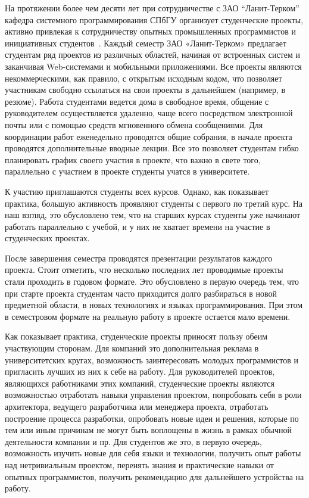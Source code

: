 \documentclass[a5paper]{article}
\begin{document}
На протяжении более чем десяти лет при сотрудничестве с ЗАО ``Ланит-Терком''~\cite{tercom} кафедра системного программирования СПбГУ организует студенческие проекты, активно привлекая к сотрудничеству опытных промышленных программистов и инициативных студентов~\cite{gagarsky}. Каждый семестр ЗАО «Ланит-Терком» предлагает студентам ряд проектов из различных областей, начиная от встроенных систем и заканчивая Web-системами и мобильными приложениями. Все проекты являются некоммерческими, как правило, с открытым исходным кодом, что позволяет участникам свободно ссылаться на свои проекты в дальнейшем (например, в резюме). Работа студентами ведется дома в свободное время, общение с руководителем осуществляется удаленно, чаще всего посредством электронной почты или с помощью средств мгновенного обмена сообщениями. Для координации работ еженедельно проводятся общие собрания, в начале проекта проводятся дополнительные вводные лекции. Все это позволяет студентам гибко планировать график своего участия в проекте, что важно в свете того, параллельно с участием в проекте студенты учатся в университете. 

К участию приглашаются студенты всех курсов. Однако, как показывает практика, б\textit{о}льшую активность проявляют студенты с первого по третий курс. На наш взгляд, это обусловлено тем, что на старших курсах студенты уже начинают работать параллельно с учебой, и у них не хватает времени на участие в студенческих проектах. 

После завершения семестра проводятся презентации результатов каждого проекта. Стоит отметить, что несколько последних лет проводимые проекты стали проходить в годовом формате. Это обусловлено в первую очередь тем, что при старте проекта студентам часто приходится долго разбираться в новой предметной области, в новых технологиях и языках программирования. При этом в семестровом формате на реальную работу в проекте остается мало времени. 

Как показывает практика, студенческие проекты приносят пользу обеим участвующим сторонам. Для компаний это дополнительная реклама в университетских кругах, возможность заинтересовать молодых программистов и пригласить лучших из них к себе на работу. Для руководителей проектов, являющихся работниками этих компаний, студенческие проекты являются возможностью отработать навыки управления проектом, попробовать себя в роли архитектора, ведущего разработчика или менеджера проекта, отработать построение процесса разработки, опробовать новые идеи и решения, которые по тем или иным причинам не могут быть воплощены в жизнь в рамках обычной деятельности компании и пр. Для студентов же это, в первую очередь, возможность изучить новые для себя языки и технологии, получить опыт работы над нетривиальным проектом, перенять знания и практические навыки от опытных программистов, получить рекомендацию для дальнейшего устройства на работу. 
\end{document}

